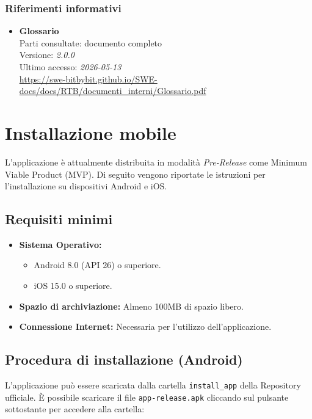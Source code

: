 \documentclass[a4paper,12pt]{article}
\begin{document}
\subsubsection{Riferimenti informativi} \label{sec:riferimenti_informativi}
\begin{itemize}
    \item \textbf{Glossario}\\
        Parti consultate: documento completo\\
        Versione: \textit{2.0.0}\\
        Ultimo accesso: \textit{2026-05-13}\\
        \url{https://swe-bitbybit.github.io/SWE-docs/docs/RTB/documenti_interni/Glossario.pdf}
\end{itemize}

\section{Installazione mobile} \label{sec:installazione_mobile}

L'applicazione è attualmente distribuita in modalità \textit{Pre-Release} come Minimum Viable Product (MVP). Di seguito vengono riportate le istruzioni per l'installazione su dispositivi Android e iOS.

\subsection{Requisiti minimi}
\begin{itemize}
    \item \textbf{Sistema Operativo:} 
    \begin{itemize}
        \item Android 8.0 (API 26) o superiore.
        \item iOS 15.0 o superiore.
    \end{itemize}
    \item \textbf{Spazio di archiviazione:} Almeno 100MB di spazio libero.
    \item \textbf{Connessione Internet:} Necessaria per l'utilizzo dell'applicazione.
\end{itemize}

\subsection{Procedura di installazione (Android)}
L'applicazione può essere scaricata dalla cartella \texttt{install\_app} della Repository ufficiale. È possibile scaricare il file \texttt{app-release.apk} cliccando sul pulsante sottostante per accedere alla cartella:
\end{document}
